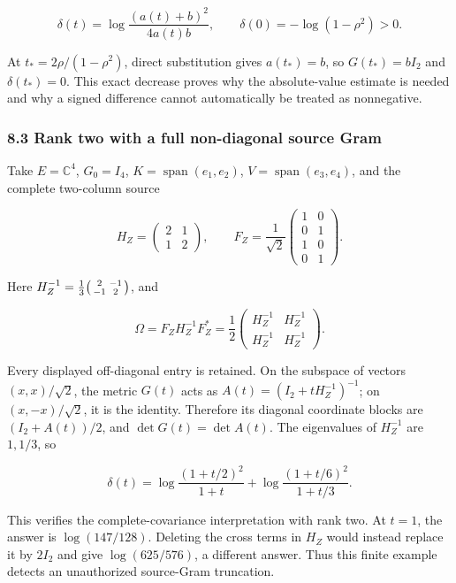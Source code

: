 \[
\delta(t)=\log\frac{(a(t)+b)^2}{4a(t)b},
\qquad \delta(0)=-\log(1-\rho^2)>0.
\tag{CA40}
\]

At \(t_*=2\rho/(1-\rho^2)\), direct substitution gives \(a(t_*)=b\), so \(G(t_*)=bI_2\) and \(\delta(t_*)=0\). This exact decrease proves why the absolute-value estimate is needed and why a signed difference cannot automatically be treated as nonnegative.

\subsubsection{8.3 Rank two with a full non-diagonal source Gram}\label{rank-two-with-a-full-non-diagonal-source-gram}

Take \(E=\mathbb C^4\), \(G_0=I_4\), \(K=\operatorname{span}(e_1,e_2)\), \(V=\operatorname{span}(e_3,e_4)\), and the complete two-column source

\[
H_Z=\begin{pmatrix}2&1\\1&2\end{pmatrix},\qquad
F_Z=\frac1{\sqrt2}\begin{pmatrix}1&0\\0&1\\1&0\\0&1\end{pmatrix}.
\]

Here \(H_Z^{-1}=\frac13\begin{psmallmatrix}2&-1\\-1&2\end{psmallmatrix}\), and

\[
\Omega=F_ZH_Z^{-1}F_Z^*
=\frac12\begin{pmatrix}H_Z^{-1}&H_Z^{-1}\\
H_Z^{-1}&H_Z^{-1}\end{pmatrix}.
\tag{CA41}
\]

Every displayed off-diagonal entry is retained. On the subspace of vectors \((x,x)/\sqrt2\), the metric \(G(t)\) acts as \(A(t)=(I_2+tH_Z^{-1})^{-1}\); on \((x,-x)/\sqrt2\), it is the identity. Therefore its diagonal coordinate blocks are \((I_2+A(t))/2\), and \(\det G(t)=\det A(t)\). The eigenvalues of \(H_Z^{-1}\) are \(1,1/3\), so

\[
\delta(t)=
\log\frac{(1+t/2)^2}{1+t}
+\log\frac{(1+t/6)^2}{1+t/3}.
\tag{CA42}
\]

This verifies the complete-covariance interpretation with rank two. At \(t=1\), the answer is \(\log(147/128)\). Deleting the cross terms in \(H_Z\) would instead replace it by \(2I_2\) and give \(\log(625/576)\), a different answer. Thus this finite example detects an unauthorized source-Gram truncation.

